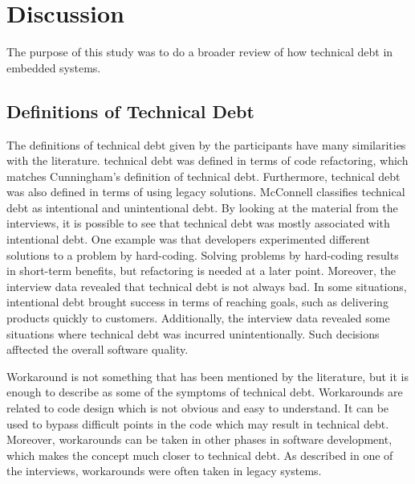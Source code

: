 \chapter{Discussion}
\label{chap:discussion}
The purpose of this study was to do a broader review of how technical debt in embedded systems.





\section{Definitions of Technical Debt}
The definitions of technical debt given by the participants have many similarities with the literature. technical debt was defined in terms of code refactoring, which matches Cunningham's definition of technical debt\cite{p29-cunningham}. Furthermore, technical debt was also defined in terms of using legacy solutions. McConnell classifies technical debt as intentional and unintentional debt\cite{url-mcconnell}. By looking at the material from the interviews, it is possible to see that technical debt was mostly associated with intentional debt. One example was that developers experimented different solutions to a problem by hard-coding. Solving problems by hard-coding results in short-term benefits, but refactoring is needed at a later point. Moreover, the interview data revealed that technical debt is not always bad. In some situations, intentional debt brought success in terms of reaching goals, such as delivering products quickly to customers. Additionally, the interview data revealed some situations where technical debt was incurred unintentionally. Such decisions afftected the overall software quality.

Workaround is not something that has been mentioned by the literature, but it is enough to describe as some of the symptoms of technical debt. Workarounds are related to code design which is not obvious and easy to understand. It can be used to bypass difficult points in the code which may result in technical debt. Moreover, workarounds can be taken in other phases in software development, which makes the concept much closer to technical debt. As described in one of the interviews, workarounds were often taken in legacy systems.

